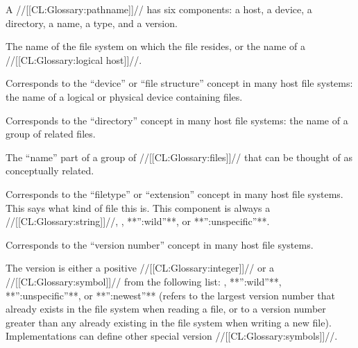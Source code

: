 

 

A //[[CL:Glossary:pathname]]// has six components:
     a host,
     a device,
     a directory,
     a name,
     a type,
 and a version.


The name of the file system on which the file resides, or the name of a //[[CL:Glossary:logical host]]//.

\endsubsubsection%


Corresponds to the ``device'' or ``file structure'' concept in many host file systems: the name of a logical or physical device containing files.

\endsubsubsection%


Corresponds to the ``directory'' concept in many host file systems: the name of a group of related files.

\endsubsubsection%


The ``name'' part of a group of //[[CL:Glossary:files]]// that can be thought of as conceptually related.

\endsubsubsection%


Corresponds to the ``filetype'' or ``extension'' concept in many host file systems.  This says what kind of file this is.   This component is always a //[[CL:Glossary:string]]//, \nil, **'':wild''**, or **'':unspecific''**.

\endsubsubsection%


Corresponds to the ``version number'' concept in many host file systems.

The version is either a positive //[[CL:Glossary:integer]]//  or a //[[CL:Glossary:symbol]]// from the following list: \nil, **'':wild''**, **'':unspecific''**, or **'':newest''** (refers to the largest version number that already exists in  the file system when reading a file, or to a version number greater than any already existing in the file system when writing a new file).  Implementations  can define other special version //[[CL:Glossary:symbols]]//.


